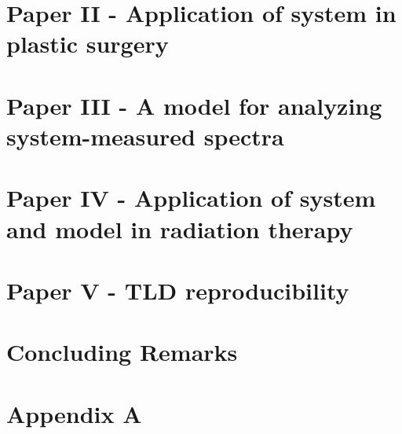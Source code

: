 \documentclass[letterpaper,12pt,twoside,openright]{report} %
\begin{document}
\chapter{Paper II - Application of system in plastic surgery}

\printbibliography[heading=subbibliography]

\chapter{Paper III - A model for analyzing system-measured spectra}

\printbibliography[heading=subbibliography]

\chapter{Paper IV - Application of system and model in radiation therapy}
%

\chapter{Paper V - TLD reproducibility}
%

\chapter{Concluding Remarks}




\appendix
\chapter{Appendix A}
\end{document}
